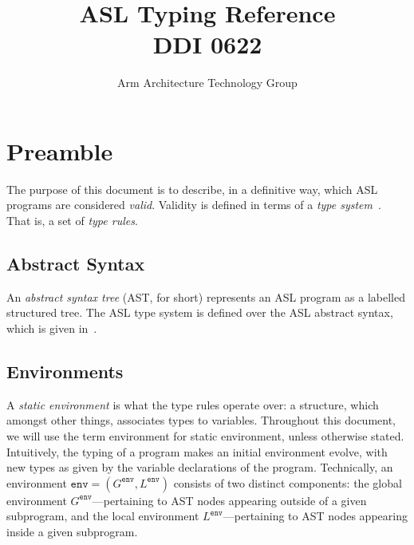 \documentclass{book}
\author{Arm Architecture Technology Group}
\title{ASL Typing Reference \\
       DDI 0622}
\newcommand\tenv[0]{\texttt{env}}
\begin{document}
\maketitle

\tableofcontents{}





\chapter{Preamble}

The purpose of this document is to describe, in a definitive way, which ASL programs are considered \emph{valid}. Validity is defined in terms of a \emph{type system}~\cite{TypeSystemsLucaCardelli}. That is, a set of \emph{type rules}.

\section{Abstract Syntax}
An \emph{abstract syntax tree} (AST, for short) represents an ASL program as a labelled structured tree.
%
The ASL type system is defined over the ASL abstract syntax, which is given in~\cite{ASLAbstractSyntaxReference}.

\section{Environments}

A \emph{static environment} is what the type rules operate over: a structure, which amongst
other things, associates types to variables.
Throughout this document, we will use the term environment for static environment, unless otherwise stated.
Intuitively, the typing of a
program makes an initial environment evolve, with new types as given by the
variable declarations of the program.
%
Technically, an environment $\tenv=(G^\tenv, L^\tenv)$ consists of two
distinct components: the global environment $G^\tenv$---pertaining to AST nodes
appearing outside of a given subprogram, and the local environment
$L^\tenv$---pertaining to AST nodes appearing inside a given subprogram.
\end{document}
